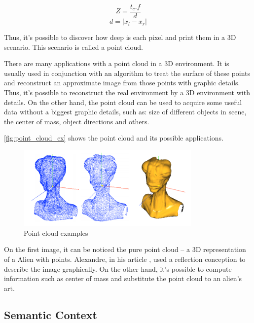     \begin{equation}\label{eq:profundidade}
    Z = \frac{t_{c}.f}{d}
    \end{equation}
    \begin{equation}\label{eq:disparidade}
    d = |x_{l}-x_{r}|
    \end{equation}

    Thus, it's possible to discover how deep is each pixel and print them in a 3D scenario. This scenario is called a point cloud.

    There are many applications with a point cloud in a 3D environment. It is usually used in conjunction with an algorithm to treat the surface of these points and reconstruct an approximate image from those points with graphic details. Thus, it's possible to reconstruct the real environment by a 3D environment with details. On the other hand, the point cloud can be used to acquire some useful data without a biggest graphic details, such as: size of different objects in scene, the center of mass, object directions and others.

    \autoref{fig:point_cloud_ex} shows the point cloud and its possible applications. 
    
    \begin{figure}[H]
     \caption{\label{fig:point_cloud_ex}
Point cloud examples}
     \begin{center}
        \includegraphics[width=0.8\textwidth]{images/imagem_point_cloud.png}
     \end{center}
    \end{figure}

On the first image, it can be noticed the pure point cloud – a 3D representation of a Alien with points. Alexandre, in his article \cite{pointCloud_ex}, used a reflection conception to describe the image graphically. On the other hand, it’s possible to compute information such as center of mass and substitute the point cloud to an alien's art.

\subsection{Semantic Context}

